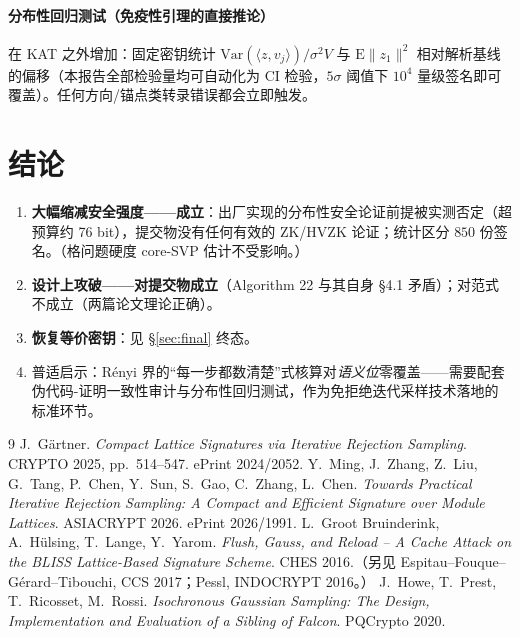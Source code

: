 \documentclass[11pt,a4paper]{ctexart}
\begin{document}
\paragraph{分布性回归测试（免疫性引理的直接推论）} 在 KAT 之外增加：固定密钥统计 $\mathrm{Var}(\langle z,v_j\rangle)/\sigma^2V$ 与 $\mathrm{E}\|z_1\|^2$ 相对解析基线的偏移（本报告全部检验量均可自动化为 CI 检验，$5\sigma$ 阈值下 $10^4$ 量级签名即可覆盖）。任何方向/锚点类转录错误都会立即触发。

\section{结论}

\begin{enumerate}[nosep]
\item \textbf{大幅缩减安全强度——成立}：出厂实现的分布性安全论证前提被实测否定（超预算约 76 bit），提交物没有任何有效的 ZK/HVZK 论证；统计区分 $850$ 份签名。（格问题硬度 core-SVP 估计不受影响。）
\item \textbf{设计上攻破——对提交物成立}（Algorithm 22 与其自身 \S4.1 矛盾）；对范式不成立（两篇论文理论正确）。
\item \textbf{恢复等价密钥}：见 \S\ref{sec:final} 终态。
\item 普适启示：Rényi 界的``每一步都数清楚''式核算对\emph{语义位}零覆盖——需要配套伪代码-证明一致性审计与分布性回归测试，作为免拒绝迭代采样技术落地的标准环节。
\end{enumerate}

\begin{thebibliography}{9}
 J.~G\"artner. \emph{Compact Lattice Signatures via Iterative Rejection Sampling}. CRYPTO 2025, pp.~514--547. ePrint 2024/2052.
 Y.~Ming, J.~Zhang, Z.~Liu, G.~Tang, P.~Chen, Y.~Sun, S.~Gao, C.~Zhang, L.~Chen. \emph{Towards Practical Iterative Rejection Sampling: A Compact and Efficient Signature over Module Lattices}. ASIACRYPT 2026. ePrint 2026/1991.
 L.~Groot Bruinderink, A.~H\"ulsing, T.~Lange, Y.~Yarom. \emph{Flush, Gauss, and Reload -- A Cache Attack on the BLISS Lattice-Based Signature Scheme}. CHES 2016.（另见 Espitau--Fouque--G\'erard--Tibouchi, CCS 2017；Pessl, INDOCRYPT 2016。）
 J.~Howe, T.~Prest, T.~Ricosset, M.~Rossi. \emph{Isochronous Gaussian Sampling: The Design, Implementation and Evaluation of a Sibling of Falcon}. PQCrypto 2020.
\end{thebibliography}

\appendix
\end{document}
